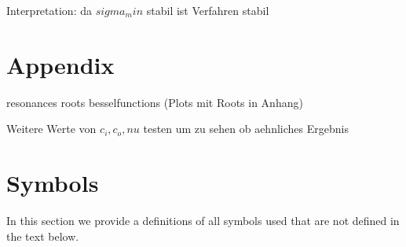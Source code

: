 \documentclass[10pt,journal,compsoc, onecolumn]{IEEEtran}
\begin{document}
Interpretation: da $sigma_min$ stabil ist Verfahren stabil 

\section{Appendix}
resonances roots besselfunctions (Plots mit Roots in Anhang)

Weitere Werte von $c_i, c_o, nu$ testen um zu sehen ob aehnliches Ergebnis 




\section*{Symbols}
In this section we provide a definitions of all symbols used that are not defined in the text below. 
\end{document}

